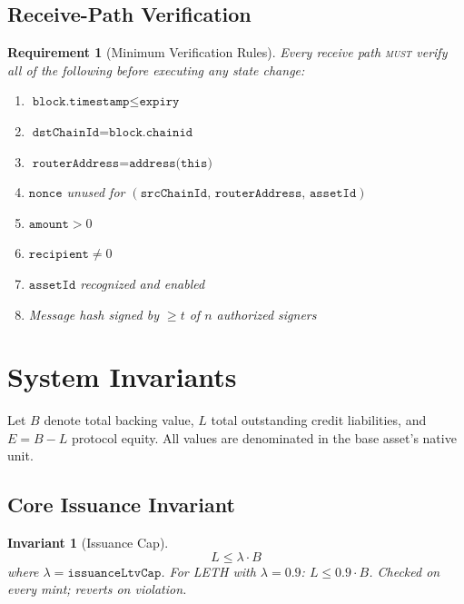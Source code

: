 \documentclass[11pt,twocolumn]{article}
\newtheorem{invariant}{Invariant}[section]
\newtheorem{requirement}{Requirement}[section]
\theoremstyle{remark}
\begin{document}
\subsection{Receive-Path Verification}

\begin{requirement}[Minimum Verification Rules]
\label{req:verify}
Every receive path \textsc{must} verify all of the following before executing any state change:
\begin{enumerate}[nosep]
  \item $\texttt{block.timestamp} \leq \texttt{expiry}$
  \item $\texttt{dstChainId} = \texttt{block.chainid}$
  \item $\texttt{routerAddress} = \texttt{address(this)}$
  \item $\texttt{nonce}$ unused for $(\texttt{srcChainId},\, \texttt{routerAddress},\, \texttt{assetId})$
  \item $\texttt{amount} > 0$
  \item $\texttt{recipient} \neq 0$
  \item $\texttt{assetId}$ recognized and enabled
  \item Message hash signed by $\geq t$ of $n$ authorized signers
\end{enumerate}
\end{requirement}


\section{System Invariants}
\label{sec:invariants}

Let $B$ denote total backing value, $L$ total outstanding credit liabilities, and $E = B - L$ protocol equity. All values are denominated in the base asset's native unit.

\subsection{Core Issuance Invariant}

\begin{invariant}[Issuance Cap]
\label{inv:issuance}
\begin{equation}
  L \leq \lambda \cdot B
\end{equation}
where $\lambda = \texttt{issuanceLtvCap}$. For LETH with $\lambda = 0.9$: $L \leq 0.9 \cdot B$. Checked on every mint; reverts on violation.
\end{invariant}
\end{document}
